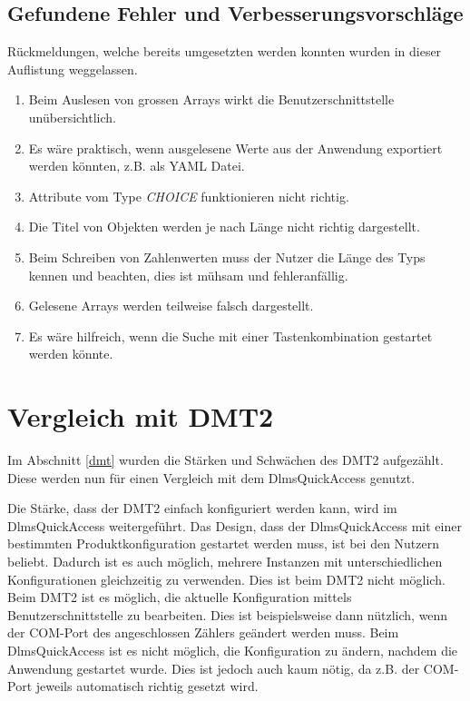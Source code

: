 \subsection{Gefundene Fehler und Verbesserungsvorschläge}\label{gefundeneFehler}
Rückmeldungen, welche bereits umgesetzten werden konnten wurden in dieser Auflistung weggelassen.
\begin{enumerate}
   \item Beim Auslesen von grossen Arrays wirkt die Benutzerschnittstelle unübersichtlich.
   \item Es wäre praktisch, wenn ausgelesene Werte aus der Anwendung exportiert werden könnten, z.B. als \ac{YAML} Datei.
   \item Attribute vom Type \textit{CHOICE} funktionieren nicht richtig.
   \item Die Titel von Objekten werden je nach Länge nicht richtig dargestellt.
   \item Beim Schreiben von Zahlenwerten muss der Nutzer die Länge des Typs kennen und beachten, dies ist mühsam und fehleranfällig.
   \item Gelesene Arrays werden teilweise falsch dargestellt.
   \item Es wäre hilfreich, wenn die Suche mit einer Tastenkombination gestartet werden könnte.
\end{enumerate}

\section{Vergleich mit DMT2}
Im Abschnitt \ref{dmt} wurden die Stärken und Schwächen des \ac{DMT2} aufgezählt.
Diese werden nun für einen Vergleich mit dem DlmsQuickAccess genutzt.

Die Stärke, dass der \ac{DMT2} einfach konfiguriert werden kann, wird im DlmsQuickAccess weitergeführt.
Das Design, dass der DlmsQuickAccess mit einer bestimmten Produktkonfiguration gestartet werden muss, ist bei den Nutzern beliebt.
Dadurch ist es auch möglich, mehrere Instanzen mit unterschiedlichen Konfigurationen gleichzeitig zu verwenden.
Dies ist beim \ac{DMT2} nicht möglich.
Beim \ac{DMT2} ist es möglich, die aktuelle Konfiguration mittels Benutzerschnittstelle zu bearbeiten.
Dies ist beispielsweise dann nützlich, wenn der COM-Port des angeschlossen Zählers geändert werden muss.
Beim DlmsQuickAccess ist es nicht möglich, die Konfiguration zu ändern, nachdem die Anwendung gestartet wurde.
Dies ist jedoch auch kaum nötig, da z.B. der COM-Port jeweils automatisch richtig gesetzt wird.


